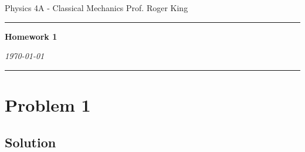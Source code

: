 \documentclass{article}
\begin{document}
\flushleft
Physics 4A - Classical Mechanics \hfill Prof. Roger King\\
\hrule

\begin{center}
    \vspace{14pt}
    \textbf{\LARGE Homework 1} \\
    \vspace{12pt}

    \textit{\today}
    \vspace{14pt}
\end{center}

\hrule

\section*{Problem 1}

\subsection*{Solution}
\end{document}
